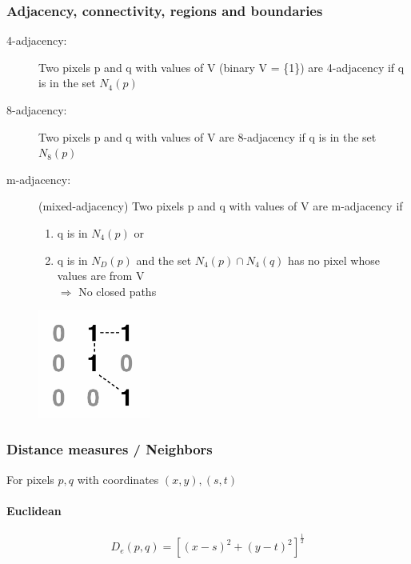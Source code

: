 \subsubsection{Adjacency, connectivity, regions and boundaries}
\begin{description}
  \item[4-adjacency:] Two pixels p and q with values of V (binary V = \{1\}) are 4-adjacency if q is in the set $N_4(p)$
  \item[8-adjacency:] Two pixels p and q with values of V are 8-adjacency if q is in the set $N_8(p)$
  \item[m-adjacency:] (mixed-adjacency) Two pixels p and q with values of V are m-adjacency if\\
    \begin{minipage}{0.8\textwidth}
  	\begin{enumerate}
  		\item q is in $N_4(p)$ or
  		\item q is in $N_D(p)$ and the set $N_4(p) \cap N_4(q)$ has no pixel whose values are from V \\ $\Rightarrow$ No closed paths
	  \end{enumerate}
  \end{minipage}
  \begin{minipage}{0.3\textwidth}
    \includegraphics[width = 0.3\textwidth]{./images/m_adjacency}
  \end{minipage}
\end{description}

\subsubsection{Distance measures / Neighbors }
For pixels $p,q$  with coordinates $(x,y), (s,t)$
\paragraph{Euclidean}
\begin{equation}
D_e(p,q) = [(x-s)^2 + (y-t)^2]^{\frac{1}{2}}
\end{equation}
